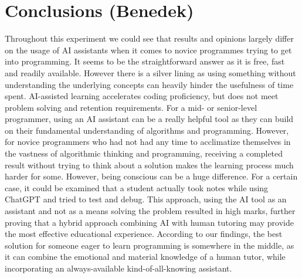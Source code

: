 \documentclass[12pt]{article}  %
\begin{document}
\section{Conclusions (Benedek)}
Throughout this experiment we could see that results and opinions largely differ on the usage of AI assistants when it comes to novice programmes trying to get into programming. It seems to be the straightforward answer as it is free, fast and readily available. However there is a silver lining as using something without understanding the underlying concepts can heavily hinder the usefulness of time spent. 
AI-assisted learning accelerates coding proficiency, but does not meet problem solving and retention requirements. For a mid- or senior-level programmer, using an AI assistant can be a really helpful tool as they can build on their fundamental understanding of algorithms and programming. However, for novice programmers who had not had any time to acclimatize themselves in the vastness of algorithmic thinking and programming, receiving a completed result without trying to think about a solution makes the learning process much harder for some. However, being conscious can be a huge difference. For a certain case, it could be examined that a student actually took notes while using ChatGPT and tried to  test and debug. This approach, using the AI tool as an assistant and not as a means solving the problem resulted in high marks, further proving that a hybrid approach combining AI with human tutoring may provide the most effective educational experience. According to our findings, the best solution for someone eager to learn programming is somewhere in the middle, as it can combine the emotional and material knowledge of a human tutor, while incorporating an always-available kind-of-all-knowing assistant. 


\end{document}
